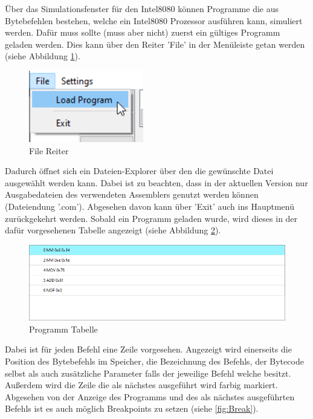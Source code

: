 \documentclass[12pt]{article}
\newcommand{\imgSpaceBefore}{\vspace{10pt}}
\begin{document}
\noindent
Über das Simulationsfenster für den Intel8080 können Programme die aus Bytebefehlen bestehen, welche ein Intel8080 Prozessor ausführen kann, simuliert werden. Dafür muss sollte (muss aber nicht) zuerst ein gültiges Programm geladen werden. Dies kann über den Reiter 'File' in der Menüleiste getan werden (siehe Abbildung \ref{fig:LoadFile}).\imgSpaceBefore

\begin{figure}[H]
\centering
\includegraphics[width=5cm]{bilder/LoadFile}
\caption{File Reiter}
\label{fig:LoadFile}
\end{figure}

\noindent
Dadurch öffnet sich ein Dateien-Explorer über den die gewünschte Datei ausgewählt werden kann. Dabei ist zu beachten, dass in der aktuellen Version nur Ausgabedateien des verwendeten Assemblers genutzt werden können (Dateiendung '.com'). Abgesehen davon kann über 'Exit' auch ins Hauptmenü zurückgekehrt werden. Sobald ein Programm geladen wurde, wird dieses in der dafür vorgesehenen Tabelle angezeigt (siehe Abbildung \ref{fig:ProgTable}).\imgSpaceBefore

\begin{figure}[H]
\centering
\includegraphics[width=15cm]{bilder/Program_table}
\caption{Programm Tabelle}
\label{fig:ProgTable}
\end{figure}

\noindent
Dabei ist für jeden Befehl eine Zeile vorgesehen. Angezeigt wird einerseits die Position des Bytebefehls im Speicher, die Bezeichnung des Befehls, der Bytecode selbst als auch zusätzliche Parameter falls der jeweilige Befehl welche besitzt. Außerdem wird die Zeile die als nächstes ausgeführt wird farbig markiert. Abgesehen von der Anzeige des Programms und des als nächstes ausgeführten Befehls ist es auch möglich Breakpoints zu setzen (siehe \ref{fig:Break}).\imgSpaceBefore
\end{document}
